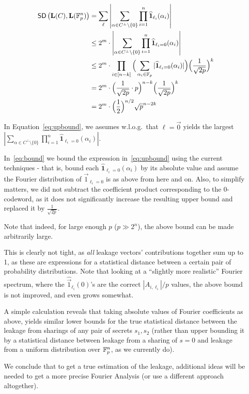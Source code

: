 \begin{align}
\mathsf{SD} \left({\mathbf{L}(C)},{\mathbf{L}(\mathbb{F}^n_p)} \right) &=\sum_{\mathbf{\ell}} \left|\sum_{\alpha\in C^{\bot}\setminus{\{0\}}}\prod^n_{i=1}\widehat{\mathbf{1}}_{\ell_i}(\alpha_i) \right|\nonumber \\ \label{eq:upbound}
& \leq 2^m \cdot \left|\sum_{\alpha\in C^{\bot}\setminus{\{0\}}}\prod^n_{i=1}\widehat{\mathbf{1}}_{\ell_i=0}(\alpha_i) \right| \\
&\leq 2^m \cdot \prod_{i\in[n-k]}\Big(\sum_{\alpha_i\in\mathbb{F}_p}|\widehat{\mathbf{1}}_{\ell_i=0}(\alpha_i)|\Big)\Big(\frac{1}{\sqrt{2p}}\Big)^{k} \label{eq:bound} \\\nonumber
&= 2^m \cdot \Big(\frac{1}{\sqrt{2p}}\cdot p\Big)^{n-k}\Big(\frac{1}{\sqrt{2p}}\Big)^k\\
&= 2^m \cdot \Big(\frac{1}{2}\Big)^{n/2}\sqrt{p}^{n-2k}\nonumber
\end{align}

In Equation~\ref{eq:upbound}, we assumes w.l.o.g.\ that $\ell=\vec{0}$ yields the largest $\left|\sum_{\alpha\in C^{\bot}\setminus{\{0\}}}\prod^n_{i=1}\widehat{\mathbf{1}}_{\ell_i=0}(\alpha_i) \right|$.

In~\ref{eq:bound} we bound 
the expression in~\ref{eq:upbound} using the current techniques - that is, bound each $\widehat{\mathbf{1}}_{\ell_i=0}(\alpha_i)$ by its absolute value and assume the Fourier distribution of $\vec{1}_{\ell_i=0}$ is as above from here and on.
Also, to simplify matters, we did not subtract the coefficient product corresponding to the 0-codeword, as it does not significantly increase the resulting upper bound and replaced it by $\frac{1}{\sqrt{2p}}$.

Note that indeed, for large enough $p$ ($p\gg2^n$), the above bound can be made arbitrarily large.

This is clearly not tight, as \emph{all} leakage vectors' contributions together sum up to 1, as these are expressions for a statistical distance between a certain pair of probability distributions. 
Note that looking at a ``slightly more realistic'' Fourier spectrum, where the $\widehat{\vec{1}}_{\ell_i}(0)$'s are the correct $|A_{i,\ell_i}|/p$ values, the above bound is not improved, and even grows somewhat. 

\begin{remark}
A simple calculation reveals that taking absolute values of Fourier coefficients as above, yields
similar lower bounds for the true statistical distance between the leakage from sharings of any pair of secrets $s_1,s_2$ (rather than upper bounding it by a statistical distance between leakage from a sharing of $s=0$ and leakage from a uniform distribution over $\mathbb{F}^n_p$, as we currently do).
\end{remark}

We conclude that to get a true estimation of the leakage, additional ideas will be needed to get a more precise Fourier Analysis (or use a different approach altogether).
